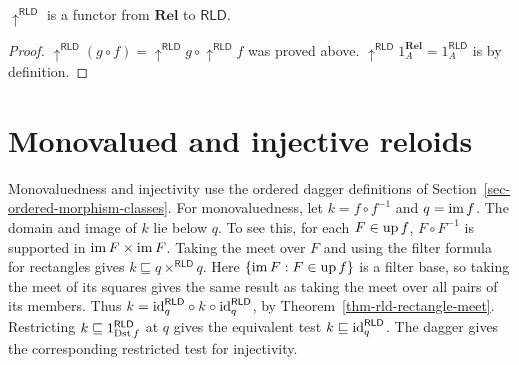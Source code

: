 \begin{prop}
$\uparrow^{\mathsf{RLD}}$ is a functor from $\mathbf{Rel}$ to $\mathsf{RLD}$.\end{prop}
\begin{proof}
$\uparrow^{\mathsf{RLD}}(g\circ f)=\uparrow^{\mathsf{RLD}}g\circ\uparrow^{\mathsf{RLD}}f$
was proved above. $\uparrow^{\mathsf{RLD}}1_{A}^{\mathbf{Rel}}=1_{A}^{\mathsf{RLD}}$
is by definition.
\end{proof}

\section{Monovalued and injective reloids}

Monovaluedness and injectivity use the ordered dagger definitions
of Section~\ref{sec-ordered-morphism-classes}. For monovaluedness,
let $k=f\circ f^{-1}$ and $q=\operatorname{im} f$. The domain and image of $k$
lie below $q$. To see this, for each $F\in\operatorname{up} f$, $F\circ F^{-1}$ is supported in
$\operatorname{im} F\times\operatorname{im} F$. Taking the meet over $F$ and using the
filter formula for rectangles gives $k\sqsubseteq q\times^{\mathsf{RLD}}q$.
Here $\{\operatorname{im} F:F\in\operatorname{up} f\}$ is a filter base, so taking the meet of
its squares gives the same result as taking the meet over all
pairs of its members. Thus $k={\operatorname{id}}_q^{\mathsf{RLD}}\circ k\circ{\operatorname{id}}_q^{\mathsf{RLD}}$,
by Theorem~\ref{thm-rld-rectangle-meet}. Restricting $k\sqsubseteq1_{\operatorname{Dst} f}^{\mathsf{RLD}}$
at $q$ gives the equivalent test $k\sqsubseteq{\operatorname{id}}_q^{\mathsf{RLD}}$.
The dagger gives the corresponding restricted test for injectivity.


